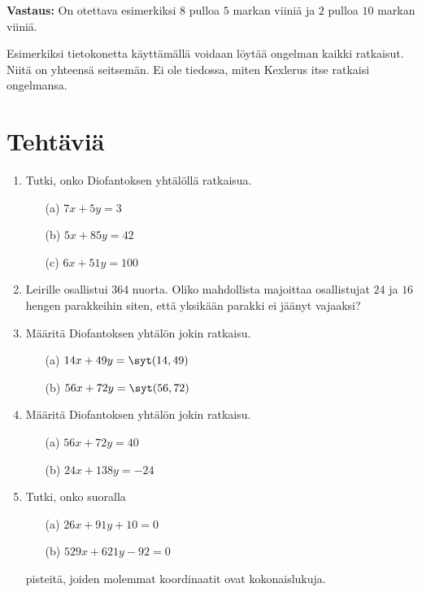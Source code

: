 {\bf Vastaus:} On otettava esimerkiksi $8$ pulloa $5$
markan viiniä ja $2$ pulloa $10$ markan viiniä.

Esimerkiksi tietokonetta käyttämällä voidaan löytää
ongelman kaikki ratkaisut. Niitä on yhteensä seitsemän.
Ei ole tiedossa, miten Kexlerus itse ratkaisi ongelmansa.

\newpage


\section*{Tehtäviä}

\begin{enumerate}

\item Tutki, onko Diofantoksen yhtälöllä ratkaisua.
\begin{itemize}
\item[(a)] $7x + 5y = 3$
\item[(b)] $5x + 85y = 42$
\item[(c)] $6x + 51y = 100$
\end{itemize}

\item Leirille osallistui $364$ nuorta. Oliko mahdollista majoittaa osallistujat $24$ ja $16$ hengen parakkeihin siten, että yksikään parakki ei jäänyt vajaaksi?

\item Määritä Diofantoksen yhtälön jokin ratkaisu.
\begin{itemize}
\item[(a)] $14x + 49y = \syt(14,49)$
\item[(b)] $56x + 72y = \syt(56,72)$
\end{itemize}

\item Määritä Diofantoksen yhtälön jokin ratkaisu.
\begin{itemize}
\item[(a)] $56x + 72y = 40$
\item[(b)] $24x + 138y = -24$
\end{itemize}

\item Tutki, onko suoralla
\begin{itemize}
\item[(a)] $26x + 91y + 10 = 0$
\item[(b)] $529x + 621y - 92 = 0$
\end{itemize}
pisteitä, joiden molemmat koordinaatit ovat kokonaislukuja.


\end{enumerate}
